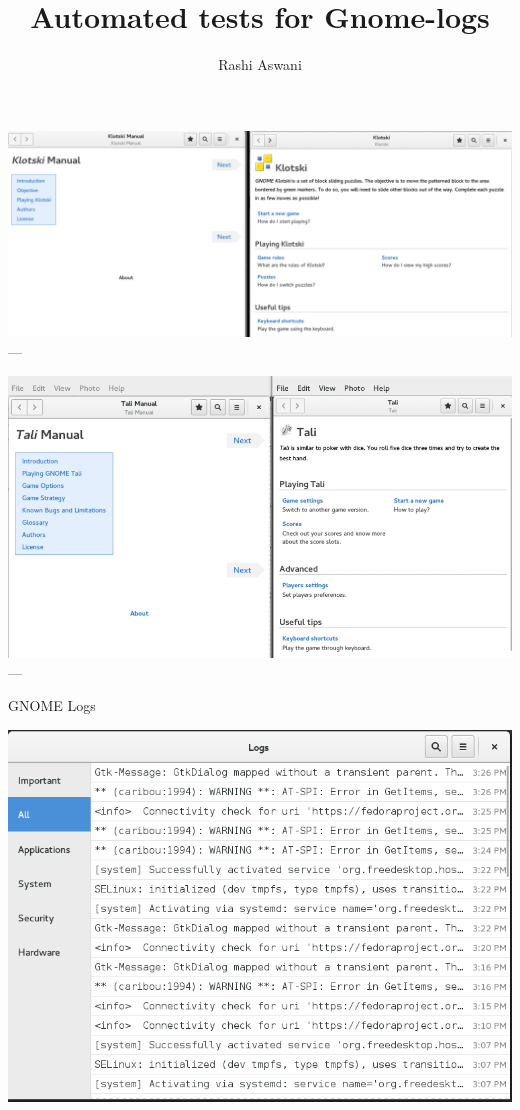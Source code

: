 \documentclass[ignorenonframetext,aspectratio=169]{beamer}
\title{Automated tests for Gnome-logs}
\author{Rashi Aswani}
\begin{document}
\frame{\titlepage}

\begin{frame}

\includegraphics[scale=0.5]{klotski1.png}\\ ---

\end{frame}

\begin{frame}

\includegraphics{Tali_picture.png}\\ ---

\end{frame}

\begin{frame}{GNOME Logs}

\includegraphics{logs.png}\\

\end{frame}
\end{document}
